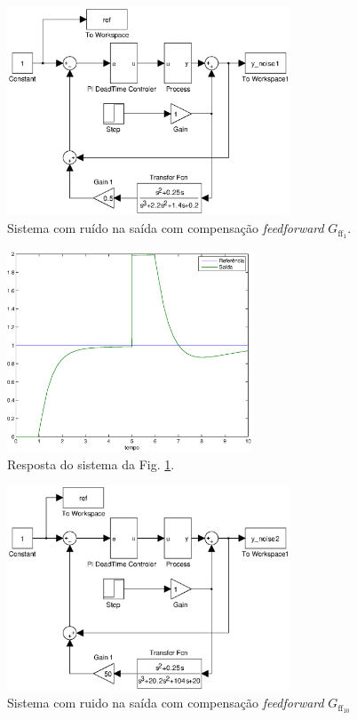 \begin{figure}[htb]
\centering
\includegraphics[width=0.75\textwidth]{imgs/questao4/sist_ruido_ff1}
\caption{Sistema com ruído na saída com compensação {\it feedforward} 
         $G_{\text{ff}_1}$.}
\label{fig:q4:sist_ruido_ff1}
\end{figure}

\begin{figure}[H]
\centering
\includegraphics[width=0.65\textwidth]{imgs/questao4/saida_ruido_ff1}
\caption{Resposta do sistema da Fig. \ref{fig:q4:sist_ruido_ff1}.}
\label{fig:q4:saida_ruido_ff1}
\end{figure}

\begin{figure}[H]
\centering
\includegraphics[width=0.75\textwidth]{imgs/questao4/sist_ruido_ff2}
\caption{Sistema com ruido na saída com compensação {\it feedforward}
         $G_{\text{ff}_{10}}$}
\label{fig:q4:sist_ruido_ff10}
\end{figure}


